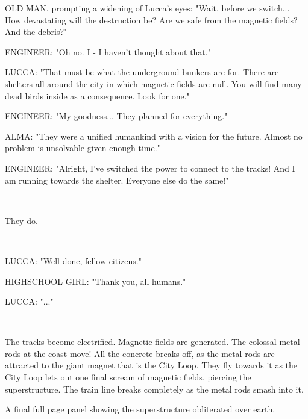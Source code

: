 \documentclass[11pt]{article}
\begin{document}
OLD MAN. prompting a widening of Lucca's eyes: "Wait, before we switch...
How devastating will the destruction be? 
Are we safe from the magnetic fields?
And the debris?"

ENGINEER: "Oh no. 
I - I haven't thought about that."

LUCCA: "That must be what the underground bunkers are for.
There are shelters all around the city in which magnetic fields are null.
You will find many dead birds inside as a consequence. 
Look for one."

ENGINEER: "My goodness... They planned for everything."

ALMA: "They were a unified humankind with a vision for the future.
Almost no problem is unsolvable given enough time."

ENGINEER: "Alright, I've switched the power to connect to the tracks!
And I am running towards the shelter. 
Everyone else do the same!"

\ 

They do.

\ 

LUCCA: "Well done, fellow citizens."

HIGHSCHOOL GIRL: "Thank you, all humans."

LUCCA: "..."

\ 

The tracks become electrified. 
Magnetic fields are generated. 
The colossal metal rods at the coast move!
All the concrete breaks off, as the metal rods are attracted to the giant magnet that is the City Loop. 
They fly towards it as the City Loop lets out one final scream of magnetic fields, piercing the superstructure.
The train line breaks completely as the metal rods smash into it. 

A final full page panel showing the superstructure obliterated over earth.
\end{document}
